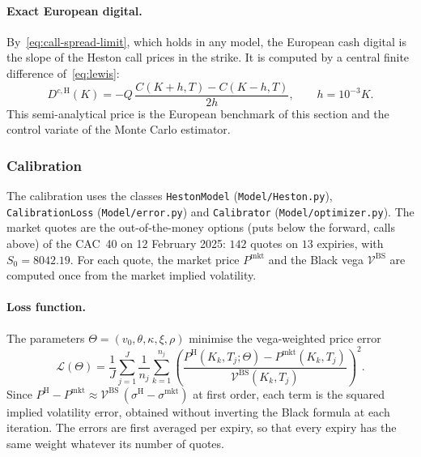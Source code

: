 \documentclass[11pt,a4paper]{article}
\theoremstyle{remark}
\newcommand{\code}[1]{\texttt{#1}}
\begin{document}
\paragraph{Exact European digital.}
By~\eqref{eq:call-spread-limit}, which holds in any model, the European cash
digital is the slope of the Heston call prices in the strike. It is computed by
a central finite difference of~\eqref{eq:lewis}:
\begin{equation}
  D^{c,\mathrm{H}}(K) = -Q\,\frac{C(K+h,T) - C(K-h,T)}{2h},
  \qquad h = 10^{-3}K.
  \label{eq:heston-european-digital}
\end{equation}
This semi-analytical price is the European benchmark of this section and the
control variate of the Monte Carlo estimator.

\subsubsection{Calibration}

The calibration uses the classes \code{HestonModel} (\code{Model/Heston.py}),
\code{CalibrationLoss} (\code{Model/error.py}) and \code{Calibrator}
(\code{Model/optimizer.py}). The market quotes are the out-of-the-money options
(puts below the forward, calls above) of the CAC~40 on 12 February 2025:
$142$ quotes on $13$ expiries, with $S_0 = 8042.19$. For each quote, the market
price $P^{\mathrm{mkt}}$ and the Black vega $\mathcal{V}^{\mathrm{BS}}$ are
computed once from the market implied volatility.

\paragraph{Loss function.}
The parameters $\Theta = (v_0, \theta, \kappa, \xi, \rho)$ minimise the
vega-weighted price error
\begin{equation}
  \mathcal{L}(\Theta) = \frac{1}{J}\sum_{j=1}^{J} \frac{1}{n_j}\sum_{k=1}^{n_j}
  \left(\frac{P^{\mathrm{H}}(K_k, T_j; \Theta) - P^{\mathrm{mkt}}(K_k, T_j)}
             {\mathcal{V}^{\mathrm{BS}}(K_k, T_j)}\right)^{2}.
  \label{eq:calibration-loss}
\end{equation}
Since $P^{\mathrm{H}} - P^{\mathrm{mkt}} \approx \mathcal{V}^{\mathrm{BS}}\,
(\sigma^{\mathrm{H}} - \sigma^{\mathrm{mkt}})$ at first order, each term is the
squared implied volatility error, obtained without inverting the Black
formula at each iteration. The errors are first averaged per expiry, so that
every expiry has the same weight whatever its number of quotes.
\end{document}
